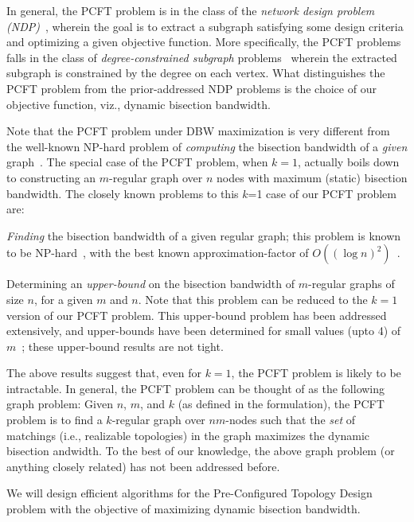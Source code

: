   In general, the PCFT
problem is in the class of the {\em network design problem
  (NDP)}~\cite{ndp-survey}, wherein the goal is to extract a subgraph
satisfying some design criteria and optimizing a given objective
function. More specifically, the PCFT problems falls in the class of
{\em degree-constrained subgraph} problems~\cite{degree-survey}
wherein the extracted subgraph is constrained by the degree on each
vertex. What distinguishes the PCFT problem from the prior-addressed
NDP problems is the choice of our objective function, viz., dynamic
bisection bandwidth.

Note that the PCFT problem under DBW maximization is very different
from the well-known NP-hard problem of {\em computing} the bisection
bandwidth of a {\em given} graph~\cite{}. The special case of the PCFT
problem, when $k=1$, actually boils down to constructing an
$m$-regular graph over $n$ nodes with maximum (static) bisection
bandwidth. The closely known problems to this $k$=1 case of our
PCFT problem are:

\squishlist
\item
{\em Finding} the bisection bandwidth of a given regular graph; this
problem is known to be NP-hard~\cite{bui-leighton-comb-1987}, with the
best known approximation-factor of $O((\log n)^2)$~\cite{fiege-focs-2000}.

\item
Determining an {\em upper-bound} on the bisection bandwidth of
$m$-regular graphs of size $n$, for a given $m$ and $n$. Note that
this problem can be reduced to the $k=1$ version of our PCFT
problem. This upper-bound problem has been addressed extensively, and
upper-bounds have been determined for small values (upto 4) of
$m$~\cite{monien-2006}; these upper-bound results are not tight.
\squishend

The above results suggest that, even for $k=1$, the PCFT problem is
likely to be intractable. In general, the PCFT problem can be thought
of as the following graph problem: Given $n$, $m$, and $k$ (as defined
in the formulation), the PCFT problem is to find a $k$-regular graph
over $nm$-nodes such that the {\em set} of matchings (i.e., realizable
topologies) in the graph maximizes the dynamic bisection andwidth. To
the best of our knowledge, the above graph problem (or anything
closely related) has not been addressed before.

\begin{task}
\label{task:pcft}
We will design efficient algorithms for the Pre-Configured Topology
Design problem with the objective of maximizing dynamic bisection
bandwidth.
\end{task}

